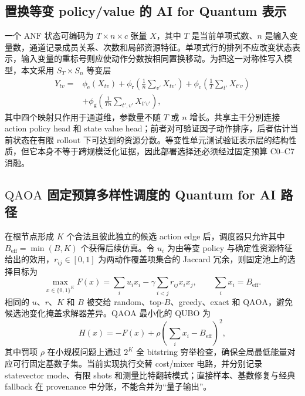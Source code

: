 \documentclass[UTF8,fontset=fandol,11pt]{ctexart}
\newcommand{\anf}{\ensuremath{\mathrm{ANF}}}
\newcommand{\qaoa}{\ensuremath{\mathrm{QAOA}}}
\begin{document}
\subsection{置换等变 policy/value 的 AI for Quantum 表示}

一个 \anf{} 状态可编码为 $T\times n\times c$ 张量 $X$，其中 $T$ 是当前单项式数、$n$ 是输入变量数，通道记录成员关系、次数和局部资源特征。单项式行的排列不应改变状态表示，输入变量的重标号则应使动作分数按相同置换移动。为把这一对称性写入模型，本文采用 $S_T\times S_n$ 等变层
\begin{equation}
\begin{split}
Y_{tv}={}&\phi_{\mathrm e}(X_{tv})
+\phi_{\mathrm r}\!\left(\frac{1}{n}\sum_{v'}X_{tv'}\right)
+\phi_{\mathrm c}\!\left(\frac{1}{T}\sum_{t'}X_{t'v}\right)\\
&+\phi_{\mathrm g}\!\left(\frac{1}{Tn}\sum_{t',v'}X_{t'v'}\right),
\end{split}
\label{eq:equivariant-layer}
\end{equation}
其中四个映射只作用于通道维，参数量不随 $T$ 或 $n$ 增长。共享主干分别连接 action policy head 和 state value head；前者对可验证因子动作排序，后者估计当前状态在有限 rollout 下可达到的资源分数。等变性单元测试验证表示层的结构性质，但它本身不等于跨规模泛化证据，因此部署选择还必须经过固定预算 C0--C7 消融。

\subsection{\qaoa{} 固定预算多样性调度的 Quantum for AI 路径}

在根节点形成 $K$ 个合法且彼此独立的候选 action edge 后，调度器只允许其中 $B_{\mathrm{eff}}=\min(B,K)$ 个获得后续仿真。令 $u_i$ 为由等变 policy 与确定性资源特征给出的效用，$r_{ij}\in[0,1]$ 为两动作覆盖项集合的 Jaccard 冗余，则固定池上的选择目标为
\begin{equation}
\max_{x\in\{0,1\}^{K}}
F(x)=\sum_i u_i x_i-\gamma\sum_{i<j}r_{ij}x_ix_j,
\qquad \sum_i x_i=B_{\mathrm{eff}} .
\label{eq:diversity-objective}
\end{equation}
相同的 $u$、$r$、$K$ 和 $B$ 被交给 random、top-$B$、greedy、exact 和 \qaoa{}，避免候选池变化掩盖求解器差异。\qaoa{} 最小化的 QUBO 为
\begin{equation}
H(x)=-F(x)+\rho\left(\sum_i x_i-B_{\mathrm{eff}}\right)^2,
\label{eq:qaoa-qubo}
\end{equation}
其中罚项 $\rho$ 在小规模问题上通过 $2^K$ 全 bitstring 穷举检查，确保全局最低能量对应可行固定基数子集。当前实现执行交替 cost/mixer 电路，并分别记录 statevector mode、有限 shots 和测量比特翻转模式；直接样本、基数修复与经典 fallback 在 provenance 中分账，不能合并为“量子输出”。
\end{document}
